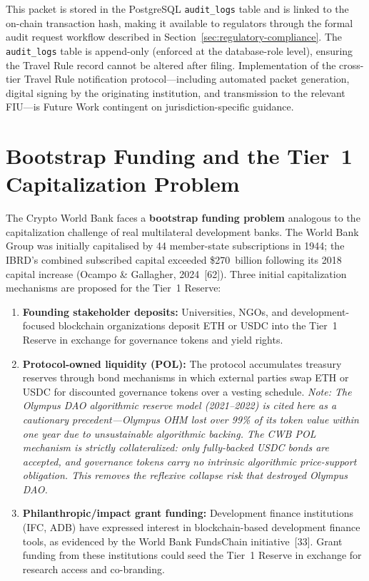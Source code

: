 \documentclass[12pt, a4paper]{report}
\begin{document}
\noindent This packet is stored in the PostgreSQL \texttt{audit\_logs} table and is linked to the on-chain transaction hash, making it available to regulators through the formal audit request workflow described in Section~\ref{sec:regulatory-compliance}. The \texttt{audit\_logs} table is append-only (enforced at the database-role level), ensuring the Travel Rule record cannot be altered after filing. Implementation of the cross-tier Travel Rule notification protocol---including automated packet generation, digital signing by the originating institution, and transmission to the relevant FIU---is Future Work contingent on jurisdiction-specific guidance.

\section{Bootstrap Funding and the Tier~1 Capitalization Problem}

The Crypto World Bank faces a \textbf{bootstrap funding problem} analogous to the capitalization challenge of real multilateral development banks. The World Bank Group was initially capitalised by 44 member-state subscriptions in 1944; the IBRD's combined subscribed capital exceeded \$270~billion following its 2018 capital increase (Ocampo \& Gallagher, 2024~[62]). Three initial capitalization mechanisms are proposed for the Tier~1 Reserve:

\begin{enumerate}[noitemsep]
\item \textbf{Founding stakeholder deposits:} Universities, NGOs, and development-focused blockchain organizations deposit ETH or USDC into the Tier~1 Reserve in exchange for governance tokens and yield rights.
\item \textbf{Protocol-owned liquidity (POL):} The protocol accumulates treasury reserves through bond mechanisms in which external parties swap ETH or USDC for discounted governance tokens over a vesting schedule. \textit{Note: The Olympus DAO algorithmic reserve model (2021--2022) is cited here as a cautionary precedent---Olympus OHM lost over 99\% of its token value within one year due to unsustainable algorithmic backing. The CWB POL mechanism is strictly collateralized: only fully-backed USDC bonds are accepted, and governance tokens carry no intrinsic algorithmic price-support obligation. This removes the reflexive collapse risk that destroyed Olympus DAO.}
\item \textbf{Philanthropic/impact grant funding:} Development finance institutions (IFC, ADB) have expressed interest in blockchain-based development finance tools, as evidenced by the World Bank FundsChain initiative~[33]. Grant funding from these institutions could seed the Tier~1 Reserve in exchange for research access and co-branding.
\end{enumerate}
\end{document}
